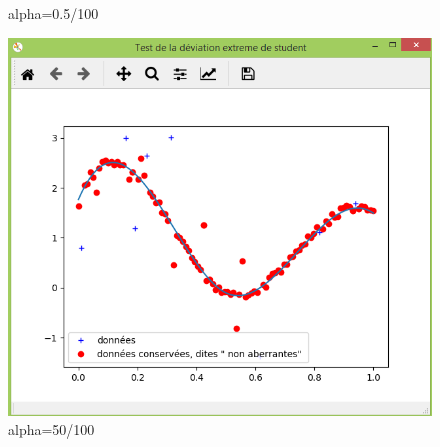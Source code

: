 \documentclass[11pt]{report}
\begin{document}
\begin{figure}[!htb]
\caption{alpha=0.5/100}
\label{alpha_0995}
\endminipage
{}%
\includegraphics[width=\linewidth]{ext50.PNG}  
\caption{alpha=50/100}
\label{alpha_2995}
\endminipage
\end{figure}

\newpage
\end{document}
